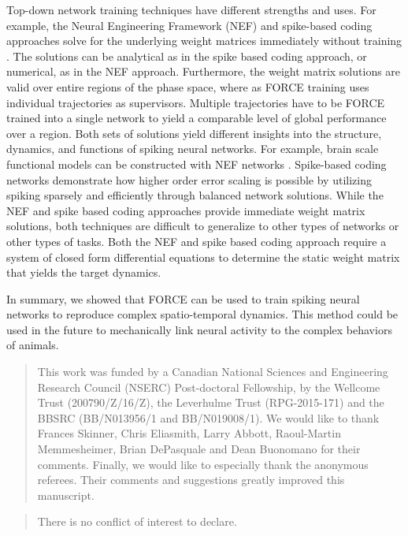 \documentclass[11pt]{article} %
\begin{document}
Top-down network training techniques have different strengths and uses.   For example, the Neural Engineering Framework (NEF) and spike-based coding approaches solve for the underlying weight matrices immediately without training \cite{Deneve1,Deneve2,Ali,Chris1,Chris2}.  The solutions can be analytical as in the spike based coding approach, or numerical, as in the NEF approach.  Furthermore, the weight matrix solutions are valid over entire regions of the phase space, where as FORCE training uses individual trajectories as supervisors.  Multiple trajectories have to be FORCE trained into a single network to yield a comparable level of global performance over a region.   Both sets of solutions yield different insights into the structure, dynamics, and functions of spiking neural networks.  For example, brain scale functional models can be constructed with NEF networks \cite{Chris1}.  Spike-based coding networks demonstrate how higher order error scaling is possible by utilizing spiking sparsely and efficiently through balanced network solutions.  While the NEF and spike based coding approaches provide immediate weight matrix solutions, both techniques are difficult to generalize to other types of networks or other types of tasks.  Both the NEF and spike based coding approach require a system of closed form differential equations to determine the static weight matrix that yields the target dynamics.  

In summary, we showed that FORCE can be used to train spiking neural networks to reproduce complex spatio-temporal dynamics. This method could be used in the future to mechanically link neural activity to the complex behaviors of animals.

\renewcommand{\abstractname}{Acknowledgements}
\begin{abstract}
 This work was funded by a Canadian National Sciences and Engineering Research Council (NSERC) Post-doctoral Fellowship, by the Wellcome Trust (200790/Z/16/Z), the Leverhulme Trust (RPG-2015-171) and the BBSRC (BB/N013956/1 and BB/N019008/1).  We would like to thank Frances Skinner, Chris Eliasmith, Larry Abbott, Raoul-Martin Memmesheimer, Brian DePasquale and Dean Buonomano for their comments.  Finally, we would like to especially thank the anonymous referees.  Their comments and suggestions greatly improved this manuscript. 
\end{abstract}

\renewcommand{\abstractname}{Conflict of Interest} 
\begin{abstract}
There is no conflict of interest to declare.   
\end{abstract}
\end{document}
